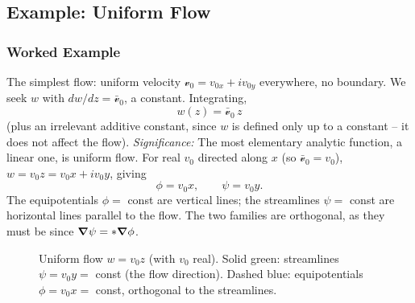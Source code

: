 \documentclass[../main.tex]{subfiles}
\begin{document}
\subsection{Example: Uniform Flow}\label{sec:lec17:uniform}

\subsubsection*{Worked Example}
The simplest flow: uniform velocity $\mathcal v_0=v_{0x}+iv_{0y}$ everywhere, no boundary. We seek $w$ with $dw/dz=\bar{\mathcal v}_0$, a constant. Integrating,
\begin{equation}
  \boxed{w(z) = \bar{\mathcal v}_0\,z}
  \label{eq:lec17_uniform_w}
\end{equation}
(plus an irrelevant additive constant, since $w$ is defined only up to a constant -- it does not affect the flow). \textit{Significance:} The most elementary analytic function, a linear one, is uniform flow. For real $v_0$ directed along $x$ (so $\bar{\mathcal v}_0=v_0$), $w=v_0 z=v_0 x+iv_0 y$, giving
\begin{equation}
  \phi = v_0 x,\qquad \psi = v_0 y.
  \label{eq:lec17_uniform_phipsi}
\end{equation}
The equipotentials $\phi=$ const are vertical lines; the streamlines $\psi=$ const are horizontal lines parallel to the flow. The two families are orthogonal, as they must be since $\grad\psi=\ast\grad\phi$.

\begin{figure}[h]
\centering
{}
\caption{Uniform flow $w=v_0 z$ (with $v_0$ real). Solid green: streamlines $\psi=v_0 y=$ const (the flow direction). Dashed blue: equipotentials $\phi=v_0 x=$ const, orthogonal to the streamlines.}
\label{fig:lec17_uniform}
\end{figure}

\end{document}
